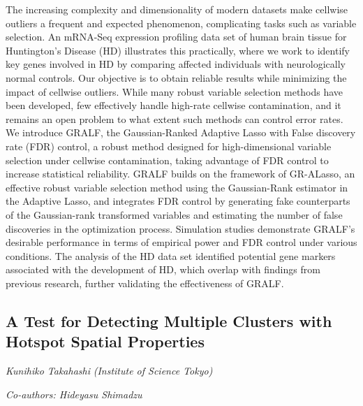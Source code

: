 \documentclass[
]{scrreprt}
\begin{document}
\setlength{\parskip}{0.5em}

The increasing complexity and dimensionality of modern datasets make
cellwise outliers a frequent and expected phenomenon, complicating tasks
such as variable selection. An mRNA-Seq expression profiling data set of
human brain tissue for Huntington's Disease (HD) illustrates this
practically, where we work to identify key genes involved in HD by
comparing affected individuals with neurologically normal controls. Our
objective is to obtain reliable results while minimizing the impact of
cellwise outliers. While many robust variable selection methods have
been developed, few effectively handle high-rate cellwise contamination,
and it remains an open problem to what extent such methods can control
error rates. We introduce GRALF, the Gaussian-Ranked Adaptive Lasso with
False discovery rate (FDR) control, a robust method designed for
high-dimensional variable selection under cellwise contamination, taking
advantage of FDR control to increase statistical reliability. GRALF
builds on the framework of GR-ALasso, an effective robust variable
selection method using the Gaussian-Rank estimator in the Adaptive
Lasso, and integrates FDR control by generating fake counterparts of the
Gaussian-rank transformed variables and estimating the number of false
discoveries in the optimization process. Simulation studies demonstrate
GRALF's desirable performance in terms of empirical power and FDR
control under various conditions. The analysis of the HD data set
identified potential gene markers associated with the development of HD,
which overlap with findings from previous research, further validating
the effectiveness of GRALF.

\subsection{A Test for Detecting Multiple Clusters with Hotspot Spatial
Properties}\label{a-test-for-detecting-multiple-clusters-with-hotspot-spatial-properties}

\emph{Kunihiko Takahashi} \emph{(Institute of
Science Tokyo)}

\emph{Co-authors: Hideyasu Shimadzu}

\setlength{\parskip}{0.5em}
\end{document}
